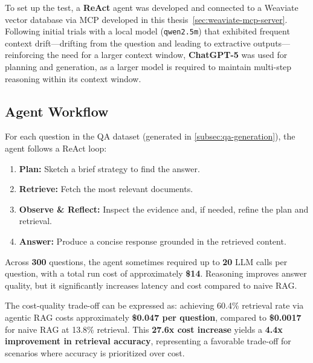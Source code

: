 To set up the test, a \textbf{ReAct} agent was developed and connected to a Weaviate vector database via \gls{MCP} developed in this thesis~\ref{sec:weaviate-mcp-server}. Following initial trials with a local model (\texttt{qwen2.5m}) that exhibited frequent context drift—drifting from the question and leading to extractive outputs—reinforcing the need for a larger context window, \textbf{ChatGPT-5} was used for planning and generation, as a larger model is required to maintain multi-step reasoning within its context window.

\subsection{Agent Workflow}
For each question in the \gls{QA} dataset (generated in \ref{subsec:qa-generation}), the agent follows a ReAct loop:
\begin{enumerate}
\item \textbf{Plan:} Sketch a brief strategy to find the answer.
\item \textbf{Retrieve:} Fetch the most relevant documents.
\item \textbf{Observe \& Reflect:} Inspect the evidence and, if needed, refine the plan and retrieval.
\item \textbf{Answer:} Produce a concise response grounded in the retrieved content.
\end{enumerate}

Across \textbf{300} questions, the agent sometimes required up to \textbf{20} \gls{LLM} calls per question, with a total run cost of approximately \textbf{\$14}. Reasoning improves answer quality, but it significantly increases latency and cost compared to naive \gls{RAG}.

The cost-quality trade-off can be expressed as: achieving 60.4\% retrieval rate via agentic \gls{RAG} costs approximately \textbf{\$0.047 per question}, compared to \textbf{\$0.0017} for naive \gls{RAG} at 13.8\% retrieval. This \textbf{27.6x cost increase} yields a \textbf{4.4x improvement in retrieval accuracy}, representing a favorable trade-off for scenarios where accuracy is prioritized over cost.

